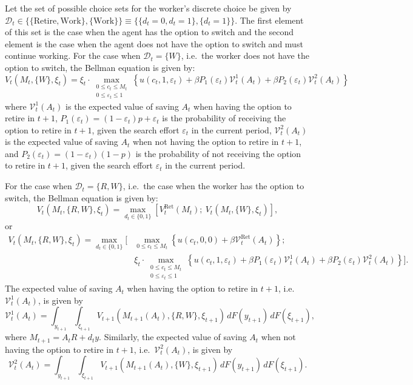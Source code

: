 \documentclass[11pt]{article}
\newcommand{\Ret}{\mathrm{Ret}}
\newcommand{\eff}{\varepsilon}
\newcommand{\goth}[1]{\mathcal{#1}}   %
\begin{document}
Let the set of possible choice sets for the worker's discrete choice be given by
$\mathcal{D}_t \in \{\{\text{Retire}, \text{Work}\}, \{\text{Work}\}\} \equiv \{\{d_t = 0, d_t = 1\}, \{d_t = 1\}\}$. The first element of
this set is the case when the agent has the option to switch and the second element is
the case when the agent does not have the option to switch and must continue working.
For the case when $\mathcal{D}_t = \{W\}$, i.e.\ the worker does not have the option to switch, the
Bellman equation is given by:
\begin{equation}
V_t(M_t, \{W\}, \xi_t) = \xi_t \cdot \max_{\substack{0 \le c_t \le M_t \\ 0 \le \eff_t \le 1}}
\left\{ u(c_t, 1, \eff_t) + \beta P_1(\eff_t) \goth{V}_t^1(A_t) + \beta P_2(\eff_t) \goth{V}_t^2(A_t) \right\}
\end{equation}
where $\goth{V}_t^1(A_t)$ is the expected value of saving $A_t$ when having the option to retire in
$t + 1$, $P_1(\eff_t) = (1 - \eff_t)p + \eff_t$ is the probability of receiving the option to retire in $t + 1$, given
the search effort $\eff_t$ in the current period, $\goth{V}_t^2(A_t)$ is the expected value of saving $A_t$ when
not having the option to retire in $t + 1$, and $P_2(\eff_t) = (1 - \eff_t)(1 - p)$ is the probability
of not receiving the option to retire in $t+1$, given the search effort $\eff_t$ in the current period.

For the case when $\mathcal{D}_t = \{R, W\}$, i.e.\ the case when the worker has the option to
switch, the Bellman equation is given by:
\begin{equation}
V_t(M_t, \{R, W\}, \xi_t) = \max_{d_t \in \{0,1\}}
\left[ V_t^{\Ret}(M_t);\ V_t(M_t, \{W\}, \xi_t) \right],
\end{equation}
or
\begin{equation}
\begin{aligned}
V_t(M_t, \{R, W\}, \xi_t) = \max_{d_t \in \{0,1\}}
\Bigg[
&\max_{0 \le c_t \le M_t} \left\{ u(c_t, 0, 0) + \beta \goth{V}_t^{\Ret}(A_t) \right\};\\
&\xi_t \cdot \max_{\substack{0 \le c_t \le M_t \\ 0 \le \eff_t \le 1}}
\left\{ u(c_t, 1, \eff_t) + \beta P_1(\eff_t) \goth{V}_t^1(A_t) + \beta P_2(\eff_t) \goth{V}_t^2(A_t) \right\}
\Bigg].
\end{aligned}
\end{equation}
The expected value of saving $A_t$ when having the option to retire in $t + 1$, i.e.\ $\goth{V}_t^1(A_t)$,
is given by
\begin{equation}
\goth{V}_t^1(A_t) = \int_{y_{t+1}} \int_{\xi_{t+1}}
V_{t+1}(M_{t+1}(A_t), \{R, W\}, \xi_{t+1})\, dF(y_{t+1})\, dF(\xi_{t+1}),
\end{equation}
where $M_{t+1} = A_t R + d_t y$. Similarly, the expected value of saving $A_t$ when not having
the option to retire in $t + 1$, i.e.\ $\goth{V}_t^2(A_t)$, is given by
\begin{equation}
\goth{V}_t^2(A_t) = \int_{y_{t+1}} \int_{\xi_{t+1}}
V_{t+1}(M_{t+1}(A_t), \{W\}, \xi_{t+1})\, dF(y_{t+1})\, dF(\xi_{t+1}).
\end{equation}
\end{document}
